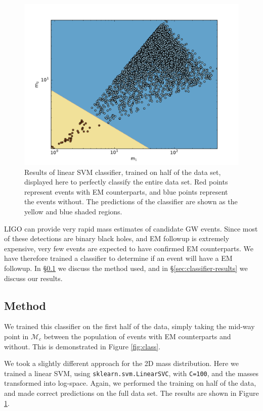 \begin{figure}[ht]
  \includegraphics[width=\textwidth]{img/classifier-2D.pdf}
  \caption{Results of linear SVM classifier, trained on half of the data set, displayed here to perfectly classify the entire data set. Red points represent events with EM counterparts, and blue points represent the events without. The predictions of the classifier are shown as the yellow and blue shaded regions.}
  \label{fig:2dclass}
\end{figure}



LIGO can provide very rapid mass estimates of candidate GW events. Since most of these detections are binary black holes, and EM followup is extremely expensive, very few events are expected to have confirmed EM counterparts. We have therefore trained a classifier to determine if an event will have a EM followup. In \S\ref{sec:classifier-method} we discuss the method used, and in \S\ref{sec:classifier-results} we discuss our results.


\subsection{Method}
\label{sec:classifier-method}
We trained this classifier on the first half of the data, simply taking the mid-way point in $\mathcal{M}_c$ between the population of events with EM counterparts and without. This is demonstrated in Figure \ref{fig:class}.

We took a slightly different approach for the 2D mass distribution. Here we trained a linear SVM, using \texttt{sklearn.svm.LinearSVC}, with \texttt{C=100}, and the masses transformed into log-space. Again, we performed the training on half of the data, and made correct predictions on the full data set. The results are shown in Figure \ref{fig:2dclass}.


